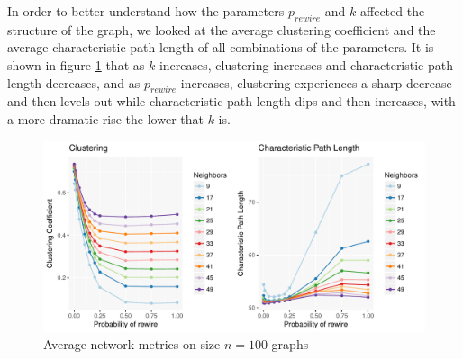 \documentclass{article}
\begin{document}
In order to better understand how the parameters $p_{rewire}$ and $k$ affected the structure of the graph, we looked at the average clustering coefficient and the average characteristic path length of all combinations of the parameters. It is shown in figure \ref{fig:clus_cpl} that as $k$ increases, clustering increases and characteristic path length decreases, and as $p_{rewire}$ increases, clustering experiences a sharp decrease and then levels out while characteristic path length dips and then increases, with a more dramatic rise the lower that $k$ is.

\begin{figure}
\centering
\includegraphics[width=1\textwidth]{metrics_plots.pdf}
\caption{\label{fig:clus_cpl}Average network metrics on size $n=100$ graphs}
\end{figure}



\end{document}
